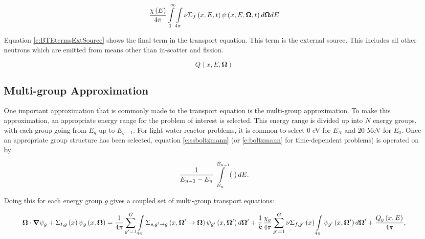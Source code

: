 \begin{equation}\label{e:BTEtermsFissionSource}
\frac{\chi\left(E\right)}{4\pi} \intop_0^{\infty} \intop_{4\pi} \nu \Sigma_f\left(x,E,t\right) \psi\left(x,E,\bm \Omega,t\right) d\bm\Omega dE
\end{equation}

Equation \ref{e:BTEtermsExtSource} shows the final term in the transport equation.  This term is the external source.  This includes all other neutrons which are emitted from means other than in-scatter and fission.

\begin{equation}\label{e:BTEtermsExtSource}
Q\left(x,E,\bm\Omega\right)
\end{equation}

\subsection{Multi-group Approximation}

One important approximation that is commonly made to the transport equation is the multi-group approximation.  To make this approximation, an appropriate energy range for the problem of interest is selected.  This energy range is divided up into $N$ energy groups, with each group going from $E_g$ up to $E_{g-1}$.  For light-water reactor problems, it is common to select 0 eV for $E_N$ and 20 MeV for $E_0$.  Once an appropriate group structure has been selected, equation \ref{e:ssboltzmann} (or \ref{e:boltzmann} for time-dependent problems) is operated on by 

\begin{equation}
\frac{1}{E_{n-1} - E_n}\intop_{E_n}^{E_{n-1}}\left(\cdot\right)dE.
\end{equation}

Doing this for each energy group $g$ gives a coupled set of multi-group transport equations:

\begin{dmath}\label{e:multigroupboltzmann}
{\bm \Omega \cdot \bm \nabla \psi_g + \Sigma_{t,g}\left(x\right)\psi_g\left(x,\bm \Omega\right) = \frac{1}{4\pi}\sum_{g'=1}^G \intop_{4\pi} \Sigma_{s,g'\rightarrow g}\left(x,\bm \Omega' \rightarrow \bm \Omega\right) \psi_{g'}\left(x,\bm \Omega'\right) d\bm \Omega'} + {\frac{1}{k}\frac{\chi_g}{4\pi} \sum_{g'=1}^{G} \nu \Sigma_{f,g'}\left(x\right) \intop_{4\pi} \psi_{g'}\left(x,\bm \Omega'\right)d\bm\Omega' + \frac{Q_g\left(x,E\right)}{4\pi}},
\end{dmath}

